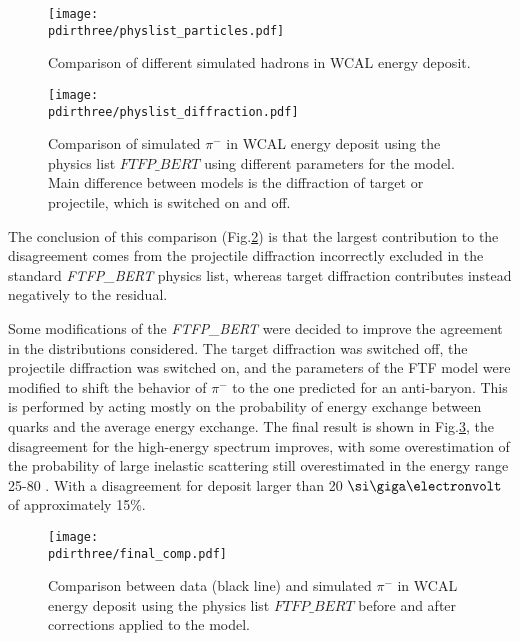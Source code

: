 \begin{figure}[tbh!]
  \centering
  \texttt{[image: \\pdirthree/physlist\_particles.pdf]}
  \caption[Comparison of different simulated hadrons in WCAL energy spectrum]{Comparison of different simulated hadrons in WCAL energy deposit.}
  \label{fig:geant4-hadron-particles}
\end{figure}

\begin{figure}[tbh!]
  \centering
  \texttt{[image: \\pdirthree/physlist\_diffraction.pdf]}
  \caption[Comparison of different diffraction limits for hadrons in WCAL energy spectrum]{Comparison of simulated $\pi^-$ in WCAL energy deposit using the physics list $FTFP\_BERT$ using different parameters for the model. Main difference between models is the diffraction of target or projectile, which is switched on and off.}
  \label{fig:geant4-hadron-diff}
\end{figure}

The conclusion of this comparison (Fig.\ref{fig:geant4-hadron-diff}) is that the largest contribution to the disagreement comes from the projectile diffraction incorrectly excluded in the standard \textit{FTFP\_BERT} physics list, whereas target diffraction contributes instead negatively to the residual.

Some modifications of the \textit{FTFP\_BERT} were decided to improve the agreement in the distributions considered. The target diffraction was switched off, the projectile diffraction was switched on, and the parameters of the FTF model were modified to shift the behavior of $\pi^-$ to the one predicted for an anti-baryon. This is performed by acting mostly on the probability of energy exchange between quarks and the average energy exchange. The final result is shown in Fig.\ref{fig:geant4-hadron-final}, the disagreement for the high-energy spectrum improves, with some overestimation of the probability of large inelastic scattering still overestimated in the energy range 25-80 \gev. With a disagreement for deposit larger than 20 $\gev$ of approximately 15\%.

\begin{figure}[tbh!]
  \centering
  \texttt{[image: \\pdirthree/final\_comp.pdf]}
  \caption[Comparison of hadron energy deposit after corrections]{Comparison between data (black line) and simulated $\pi^-$ in WCAL energy deposit using the physics list $FTFP\_BERT$ before and after corrections applied to the model.}
  \label{fig:geant4-hadron-final}
\end{figure}

